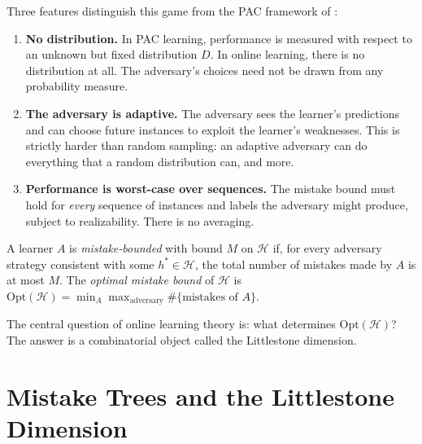 Three features distinguish this game from the PAC framework of :

\begin{enumerate}[leftmargin=*, itemsep=3pt]
\item \textbf{No distribution.} In PAC learning, performance is measured with respect to an unknown but fixed distribution $D$. In online learning, there is no distribution at all. The adversary's choices need not be drawn from any probability measure.

\item \textbf{The adversary is adaptive.} The adversary sees the learner's predictions and can choose future instances to exploit the learner's weaknesses. This is strictly harder than random sampling: an adaptive adversary can do everything that a random distribution can, and more.

\item \textbf{Performance is worst-case over sequences.} The mistake bound must hold for \emph{every} sequence of instances and labels the adversary might produce, subject to realizability. There is no averaging.
\end{enumerate}

\begin{defn}
\label{def:mistake-bound}
  \leanok
A learner $A$ is \emph{mistake-bounded} with bound $M$ on $\mathcal{H}$ if, for every adversary strategy consistent with some $h^* \in \mathcal{H}$, the total number of mistakes made by $A$ is at most $M$. The \emph{optimal mistake bound} of $\mathcal{H}$ is $\mathrm{Opt}(\mathcal{H}) = \min_A \max_{\mathrm{adversary}} \#\{\text{mistakes of } A\}$.
\end{defn}

The central question of online learning theory is: what determines $\mathrm{Opt}(\mathcal{H})$? The answer is a combinatorial object called the Littlestone dimension.


\section{Mistake Trees and the Littlestone Dimension}
\label{sec:mistake-trees}

